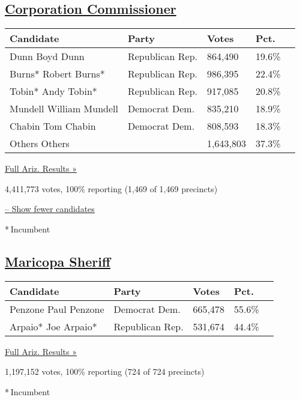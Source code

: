 \hypertarget{corporation-commissioner}{%
\subsection{\texorpdfstring{\href{https://www.nytimes3xbfgragh.onion/elections/2016/results/arizona-corporation-commissioner-4-year-term}{Corporation
Commissioner}}{Corporation Commissioner}}\label{corporation-commissioner}}

\begin{longtable}[]{@{}lllll@{}}
\toprule
Candidate & Party & Votes & Pct. &\tabularnewline
\midrule
\endhead
 Dunn Boyd Dunn & Republican Rep. & 864,490 & 19.6\% &\tabularnewline
 Burns* Robert Burns* & Republican Rep. & 986,395 & 22.4\%
&\tabularnewline
 Tobin* Andy Tobin* & Republican Rep. & 917,085 & 20.8\%
&\tabularnewline
 Mundell William Mundell & Democrat Dem. & 835,210 & 18.9\%
&\tabularnewline
 Chabin Tom Chabin & Democrat Dem. & 808,593 & 18.3\% &\tabularnewline
 Others Others & & 1,643,803 & 37.3\% &\tabularnewline
\bottomrule
\end{longtable}

\href{https://www.nytimes3xbfgragh.onion/elections/2016/results/arizona}{Full
Ariz. Results »}

4,411,773 votes, 100\% reporting (1,469 of 1,469 precincts)

\protect\hyperlink{}{-- Show fewer candidates}

* Incumbent

\hypertarget{maricopa-sheriff}{%
\subsection{\texorpdfstring{\href{https://www.nytimes3xbfgragh.onion/elections/2016/results/arizona-sheriff-maricopa}{Maricopa
Sheriff}}{Maricopa Sheriff}}\label{maricopa-sheriff}}

\begin{longtable}[]{@{}lllll@{}}
\toprule
Candidate & Party & Votes & Pct. &\tabularnewline
\midrule
\endhead
 Penzone Paul Penzone & Democrat Dem. & 665,478 & 55.6\%
&\tabularnewline
 Arpaio* Joe Arpaio* & Republican Rep. & 531,674 & 44.4\%
&\tabularnewline
\bottomrule
\end{longtable}

\href{https://www.nytimes3xbfgragh.onion/elections/2016/results/arizona}{Full
Ariz. Results »}

1,197,152 votes, 100\% reporting (724 of 724 precincts)

* Incumbent

